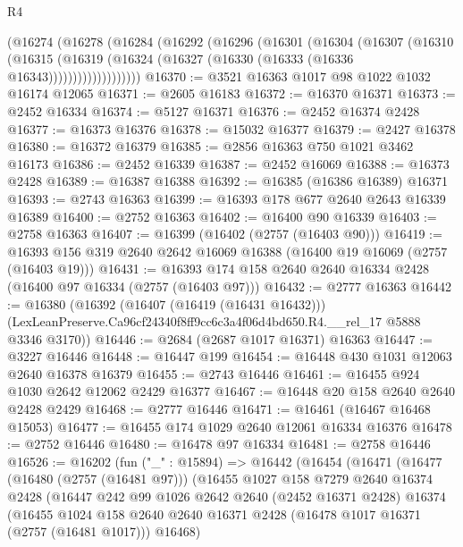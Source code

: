 \begin{lexlean}{R4}
\begin{coremodule}
          (@16274
            (@16278
              (@16284
                (@16292
                  (@16296
                    (@16301
                      (@16304
                        (@16307
                          (@16310
                            (@16315
                              (@16319
                                (@16324 (@16327 (@16330 (@16333 (@16336 @16343)))))))))))))))))))
@16370 := @3521 @16363 @1017 @98 @1022 @1032 @16174 @12065
@16371 := @2605 @16183
@16372 := @16370 @16371
@16373 := @2452 @16334
@16374 := @5127 @16371
@16376 := @2452 @16374 @2428
@16377 := @16373 @16376
@16378 := @15032 @16377
@16379 := @2427 @16378
@16380 := @16372 @16379
@16385 := @2856 @16363 @750 @1021 @3462 @16173
@16386 := @2452 @16339
@16387 := @2452 @16069
@16388 := @16373 @2428
@16389 := @16387 @16388
@16392 := @16385 (@16386 @16389) @16371
@16393 := @2743 @16363
@16399 := @16393 @178 @677 @2640 @2643 @16339 @16389
@16400 := @2752 @16363
@16402 := @16400 @90 @16339
@16403 := @2758 @16363
@16407 := @16399 (@16402 (@2757 (@16403 @90)))
@16419 := @16393 @156 @319 @2640 @2642 @16069 @16388 (@16400 @19 @16069 (@2757 (@16403 @19)))
@16431 := @16393 @174 @158 @2640 @2640 @16334 @2428 (@16400 @97 @16334 (@2757 (@16403 @97)))
@16432 := @2777 @16363
@16442 := @16380
    (@16392
      (@16407 (@16419 (@16431 @16432)))
      (LexLeanPreserve.Ca96cf24340f8ff9cc6c3a4f06d4bd650.R4.__rel_17 @5888 @3346 @3170))
@16446 := @2684 (@2687 @1017 @16371) @16363
@16447 := @3227 @16446
@16448 := @16447 @199
@16454 := @16448 @430 @1031 @12063 @2640 @16378 @16379
@16455 := @2743 @16446
@16461 := @16455 @924 @1030 @2642 @12062 @2429 @16377
@16467 := @16448 @20 @158 @2640 @2640 @2428 @2429
@16468 := @2777 @16446
@16471 := @16461 (@16467 @16468 @15053)
@16477 := @16455 @174 @1029 @2640 @12061 @16334 @16376
@16478 := @2752 @16446
@16480 := @16478 @97 @16334
@16481 := @2758 @16446
@16526 := @16202
    (fun ("_" : @15894) =>
    @16442
      (@16454
        (@16471
          (@16477
            (@16480 (@2757 (@16481 @97)))
            (@16455
              @1027
              @158
              @7279
              @2640
              @16374
              @2428
              (@16447
                @242
                @99
                @1026
                @2642
                @2640
                (@2452 @16371 @2428)
                @16374
                (@16455
                  @1024
                  @158
                  @2640
                  @2640
                  @16371
                  @2428
                  (@16478 @1017 @16371 (@2757 (@16481 @1017)))
                  @16468)

\end{coremodule}
\end{lexlean}
